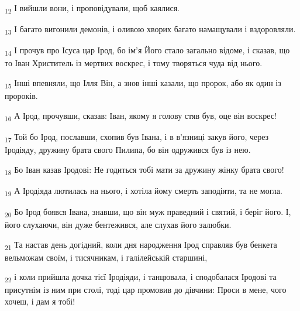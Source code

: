 \begin{tcolorbox}
\textsubscript{12} І вийшли вони, і проповідували, щоб каялися.
\end{tcolorbox}
\begin{tcolorbox}
\textsubscript{13} І багато вигонили демонів, і оливою хворих багато намащували і вздоровляли.
\end{tcolorbox}
\begin{tcolorbox}
\textsubscript{14} І прочув про Ісуса цар Ірод, бо ім'я Його стало загально відоме, і сказав, що то Іван Христитель із мертвих воскрес, і тому творяться чуда від нього.
\end{tcolorbox}
\begin{tcolorbox}
\textsubscript{15} Інші впевняли, що Ілля Він, а знов інші казали, що пророк, або як один із пророків.
\end{tcolorbox}
\begin{tcolorbox}
\textsubscript{16} А Ірод, прочувши, сказав: Іван, якому я голову стяв був, оце він воскрес!
\end{tcolorbox}
\begin{tcolorbox}
\textsubscript{17} Той бо Ірод, пославши, схопив був Івана, і в в'язниці закув його, через Іродіяду, дружину брата свого Пилипа, бо він одружився був із нею.
\end{tcolorbox}
\begin{tcolorbox}
\textsubscript{18} Бо Іван казав Іродові: Не годиться тобі мати за дружину жінку брата свого!
\end{tcolorbox}
\begin{tcolorbox}
\textsubscript{19} А Іродіяда лютилась на нього, і хотіла йому смерть заподіяти, та не могла.
\end{tcolorbox}
\begin{tcolorbox}
\textsubscript{20} Бо Ірод боявся Івана, знавши, що він муж праведний і святий, і беріг його. І, його слухаючи, він дуже бентежився, але слухав його залюбки.
\end{tcolorbox}
\begin{tcolorbox}
\textsubscript{21} Та настав день догідний, коли дня народження Ірод справляв був бенкета вельможам своїм, і тисячникам, і галілейській старшині,
\end{tcolorbox}
\begin{tcolorbox}
\textsubscript{22} і коли прийшла дочка тієї Іродіяди, і танцювала, і сподобалася Іродові та присутнім із ним при столі, тоді цар промовив до дівчини: Проси в мене, чого хочеш, і дам я тобі!
\end{tcolorbox}
